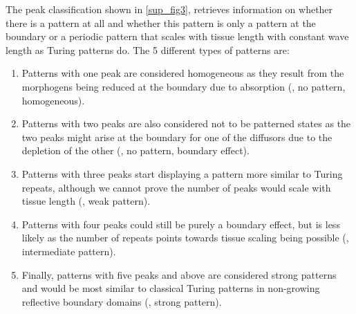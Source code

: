 The peak classification shown in \ref{sup_fig3}, retrieves information on whether there is a pattern at all and whether this pattern is only a pattern at the boundary or a periodic pattern that scales with tissue length with constant wave length as Turing patterns do.
The 5 different types of patterns are:
\begin{enumerate}
    \item Patterns with one peak are considered homogeneous as they result from the morphogens being reduced at the boundary due to absorption (, no pattern, homogeneous).
    \item Patterns with two peaks are also considered not to be patterned states as the two peaks might arise at the boundary for one of the diffusors due to the depletion of the other (, no pattern, boundary effect).
    \item Patterns with three peaks start displaying a pattern more similar to Turing repeats, although we cannot prove the number of peaks would scale with tissue length  (, weak pattern).
    \item Patterns with four peaks could still be purely a boundary effect, but is less likely as the number of repeats points towards tissue scaling being possible (, intermediate pattern).
    \item Finally, patterns with five peaks and above are considered strong patterns and would be most similar to classical Turing patterns in non-growing reflective boundary domains (, strong pattern).
\end{enumerate}


